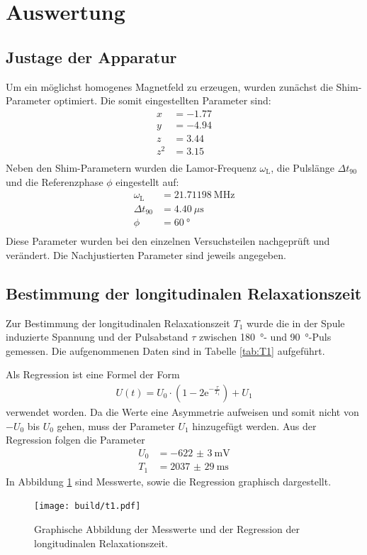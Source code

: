 \newpage
\section{Auswertung}
\label{sec:Auswertung}

\subsection{Justage der Apparatur}
Um ein möglichst homogenes Magnetfeld zu erzeugen, wurden zunächst die
Shim-Parameter optimiert. Die somit eingestellten Parameter sind:
\begin{align*}
  x &= \num{-1.77}  \\
  y &= \num{-4.94}  \\
  z &= \num{+3.44}  \\
  z^2 &= \num{+3.15} \\
\end{align*}
Neben den Shim-Parametern wurden die Lamor-Frequenz $\omega_\text{L}$, die
Pulslänge $\Delta t_\text{90}$ und die Referenzphase $\phi$ eingestellt auf:
\begin{align*}
  \omega_\text{L} &= \SI{21.71198}{\mega\hertz} \\
  \Delta t_\text{90} &= \SI{4.40}{\mu\second} \\
  \phi &= \SI{60}{\degree} \\
\end{align*}
Diese Parameter wurden bei den einzelnen Versuchsteilen nachgeprüft und
verändert. Die Nachjustierten Parameter sind jeweils angegeben.

\subsection{Bestimmung der longitudinalen Relaxationszeit}
Zur Bestimmung der longitudinalen Relaxationszeit $T_1$ wurde die in der
Spule induzierte Spannung und der Pulsabstand $\tau$ zwischen \SI{180}{\degree}-
und \SI{90}{\degree}-Puls gemessen. Die aufgenommenen Daten sind in Tabelle
\ref{tab:T1} aufgeführt.

\FloatBarrier
Als Regression ist eine Formel der Form
\begin{align*}
  U(t) = U_0 \cdot \left(1- 2\text{e}^{-\frac{\tau}{T_1}}\right) + U_1
\end{align*}
verwendet worden. Da die Werte eine Asymmetrie aufweisen und somit nicht von
$-U_0$ bis $U_0$ gehen, muss der Parameter $U_1$ hinzugefügt werden.
Aus der Regression folgen die Parameter
\begin{align*}
  U_0 &= -\SI{622(3)}{\milli\volt} \\
  T_1 &= \SI{2037(29)}{\milli\second}
\end{align*}
In Abbildung \ref{plt:T1} sind Messwerte, sowie die Regression graphisch dargestellt.
\begin{figure}[htb]
  \centering
  \texttt{[image: build/t1.pdf]}
  \caption{Graphische Abbildung der Messwerte und der Regression der longitudinalen Relaxationszeit.}
  \label{plt:T1}
\end{figure}


